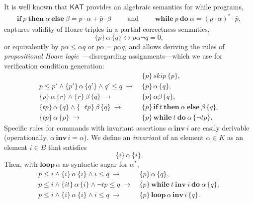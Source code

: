 \documentclass[envcountsames]{llncs}
\newcommand{\IF}[3]{\mathbf{if}\ #1\ \mathbf{then}\ #2\ \mathbf{else}\ #3}
\newcommand{\WHILE}[2]{\mathbf{while}\ #1\ \mathbf{do}\ #2}
\newcommand{\WHILEI}[3]{\mathbf{while}\ #1\ \mathbf{inv}\ #2\ \mathbf{do}\ #3}
\newcommand{\sskip}{\mathit{skip}}
\newcommand{\KAT}{\mathsf{KAT}}
\begin{document}
It is well known that $\KAT$ provides an algebraic semantics for while
programs,
\begin{align*}
  \IF{p}{\alpha}{\beta} = p\cdot \alpha + \bar p \cdot
  \beta\qquad\text{ and }\qquad
\WHILE{p}{\alpha} = (p\cdot \alpha)^\ast \cdot \bar p,
\end{align*}
captures validity of Hoare triples in
a partial correctness semantics,
\begin{equation*}
  \{p\}\, \alpha\, \{q\} \leftrightarrow p\alpha\neg q = 0,
\end{equation*}
or equivalently by $p\alpha\le \alpha q$ or $p\alpha = p\alpha q$, and
allows deriving the rules of \emph{propositional Hoare
  logic}~\cite{Kozen00}---disregarding assignments---which we use for
verification condition generation:
\begin{align}
  &\{p\}\, \sskip\, \{p\}, \label{eq:h-skip}\tag{h-skip}\\
  p\le p' \land \{p'\}\, \alpha\, \{q'\} \land q'\le q\ \rightarrow\ &
                                                                       \{p\}\,
                                                                       \alpha\,
                                                                       \{q\},\label{eq:h-cons}\tag{h-cons}\\
  \{p\}\, \alpha\, \{r\} \land \{r\}\, \beta\, \{q\}\ \rightarrow\
  &\{p\}\, \alpha\beta\, \{q\},\label{eq:h-seq}\tag{h-seq}\\
  \{tp\}\, \alpha\, \{q\}\land \{\neg tp\}\, \beta\, \{q\}\
  \rightarrow\ & \{p\}\, \IF{t}{\alpha}{\beta}\, \{q\},\label{eq:h-cond}\tag{h-cond}\\
  \{tp\}\, \alpha\, \{p\}\ \rightarrow\ & \{p\}\, \WHILE{t}{\alpha}\, \{\neg tp\}.\label{eq:h-while}\tag{h-while}
\end{align}
Specific rules for commands with invariant assertions
$\alpha\ \mathbf{inv}\ i$ are easily derivable (operationally,
$\alpha\, \mathbf{inv}\, i = \alpha$).  We define an \emph{invariant}
of an element $\alpha\in K$ as an element $i\in B$ that satisfies
\begin{equation*}
  \{i\}\, \alpha\, \{i\}.
\end{equation*}
Then, with $\mathbf{loop}\, \alpha$ as syntactic sugar for $\alpha^\ast$,
\begin{align}
  p\le i \land \{i\}\, \alpha\, \{i\}\land i\le q\ \rightarrow\
  &\{p\}\, \alpha\, \{q\},\label{eq:h-inv}\tag{h-inv}\\
  p \le i \wedge \{it\}\, \alpha\, \{i\} \wedge \neg t p\le q\
  \rightarrow \ & \{p\}\, \WHILEI{t}{i}{\alpha}\,  \{q\},\label{eq:h-while-inv}\tag{h-while-inv}\\
   p\le i \land \{i\}\, \alpha\, \{i\}\land i\le q\ \rightarrow\ &
                                                                   \{p\}\, \mathbf{loop}\, \alpha\,
    \mathbf{inv}\, i\, \{q\}. \label{eq:h-loop-inv}\tag{h-loop-inv}
\end{align}
\end{document}
